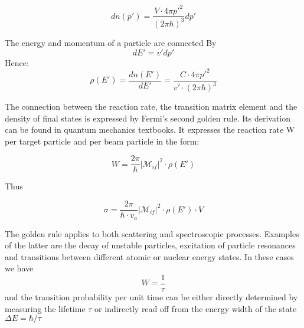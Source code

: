 \documentclass[10pt,a4paper]{article}
\begin{document}
\begin{equation}
    dn(p')=\frac{V\cdot 4\pi p'^2}{(2\pi\hbar)^3}dp'
\end{equation}

The energy and momentum of a particle are connected By
\begin{equation}
    dE' = v'dp'
\end{equation}
Hence:
\begin{equation}
    \rho(E') = \frac{dn(E')}{dE'} = \frac{C\cdot 4\pi p'^2}{v'\cdot(2\pi\hbar)^3}
\end{equation}

The connection between the reaction rate, the transition matrix element and the density of final states is expressed by Fermi's second golden rule. Its derivation can be found in quantum mechanics textbooks. It expresses the reaction rate W per target particle and per beam particle in the form:

\begin{equation}
    W = \frac{2\pi}{\hbar}|\mathcal{M}_{if}|^2\cdot \rho(E')
\end{equation}

Thus

\begin{equation}
    \sigma=\frac{2\pi}{\hbar\cdot v_a}|\mathcal{M}_{if}|^2\cdot \rho(E')\cdot V
\end{equation}

The golden rule applies to both scattering and spectroscopic processes. Examples of the latter are the decay of unstable particles, excitation of particle resonances and transitions between different atomic or nuclear energy states. In these cases we have
\begin{equation}
    W = \frac{1}{\tau}
\end{equation}
and the transition probability per unit time can be either directly determined by measuring the lifetime $\tau$ or indirectly read off from the energy width of the state $\Delta E = \hbar /\tau$
\end{document}
